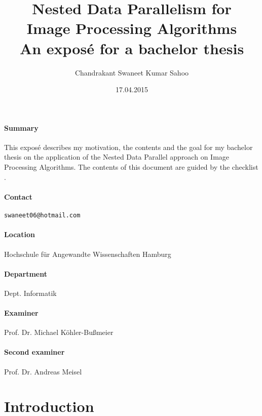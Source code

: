 \documentclass{article}
\title{
    Nested Data Parallelism for\\ Image Processing Algorithms \\[7pt]
    \large An exposé for a bachelor thesis
}
\date{17.04.2015}
\author{Chandrakant Swaneet Kumar Sahoo}
\begin{document}
    
    \maketitle
    
    \paragraph{Summary}
    
    This exposé describes my motivation, the contents and the goal
    for my bachelor thesis on the application of the Nested Data Parallel approach
    on Image Processing Algorithms. The contents of this document are guided
    by the checklist \cite{Khl2012Expose}.
    
    \paragraph{Contact} \texttt{swaneet06@hotmail.com}
    
    \paragraph{Location} Hochschule für Angewandte Wissenschaften Hamburg
    \paragraph{Department} Dept. Informatik
    \paragraph{Examiner} Prof. Dr. Michael Köhler-Bußmeier
    \paragraph{Second examiner} Prof. Dr. Andreas Meisel
    
    \newpage
    
    \tableofcontents
    
    \newpage
    
    \section{Introduction}
    
\end{document}
